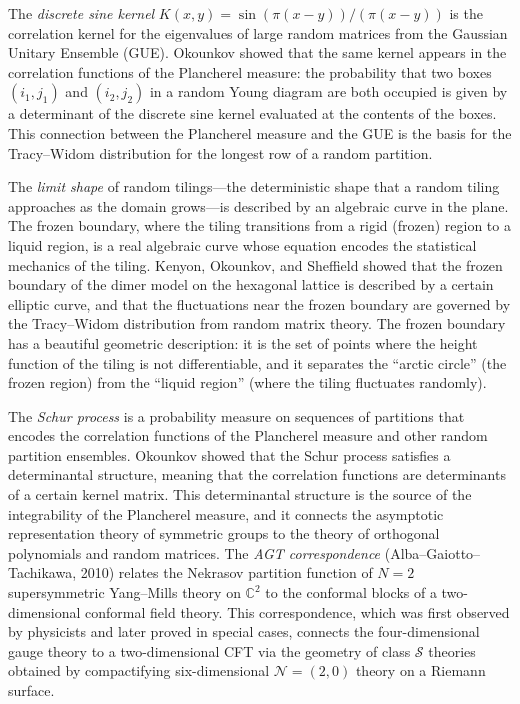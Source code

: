 The \emph{discrete sine kernel} $K(x,y) = \sin(\pi(x-y))/(\pi(x-y))$ is the correlation kernel for the eigenvalues of large random matrices from the Gaussian Unitary Ensemble (GUE). Okounkov showed that the same kernel appears in the correlation functions of the Plancherel measure: the probability that two boxes $(i_1, j_1)$ and $(i_2, j_2)$ in a random Young diagram are both occupied is given by a determinant of the discrete sine kernel evaluated at the contents of the boxes. This connection between the Plancherel measure and the GUE is the basis for the Tracy--Widom distribution for the longest row of a random partition.

The \emph{limit shape} of random tilings---the deterministic shape that a random tiling approaches as the domain grows---is described by an algebraic curve in the plane. The frozen boundary, where the tiling transitions from a rigid (frozen) region to a liquid region, is a real algebraic curve whose equation encodes the statistical mechanics of the tiling. Kenyon, Okounkov, and Sheffield showed that the frozen boundary of the dimer model on the hexagonal lattice is described by a certain elliptic curve, and that the fluctuations near the frozen boundary are governed by the Tracy--Widom distribution from random matrix theory. The frozen boundary has a beautiful geometric description: it is the set of points where the height function of the tiling is not differentiable, and it separates the ``arctic circle'' (the frozen region) from the ``liquid region'' (where the tiling fluctuates randomly).

The \emph{Schur process} is a probability measure on sequences of partitions that encodes the correlation functions of the Plancherel measure and other random partition ensembles. Okounkov showed that the Schur process satisfies a determinantal structure, meaning that the correlation functions are determinants of a certain kernel matrix. This determinantal structure is the source of the integrability of the Plancherel measure, and it connects the asymptotic representation theory of symmetric groups to the theory of orthogonal polynomials and random matrices. The \emph{AGT correspondence} (Alba--Gaiotto--Tachikawa, 2010) relates the Nekrasov partition function of $N=2$ supersymmetric Yang--Mills theory on $\mathbb{C}^2$ to the conformal blocks of a two-dimensional conformal field theory. This correspondence, which was first observed by physicists and later proved in special cases, connects the four-dimensional gauge theory to a two-dimensional CFT via the geometry of class $\mathcal{S}$ theories obtained by compactifying six-dimensional $\mathcal{N}=(2,0)$ theory on a Riemann surface.


